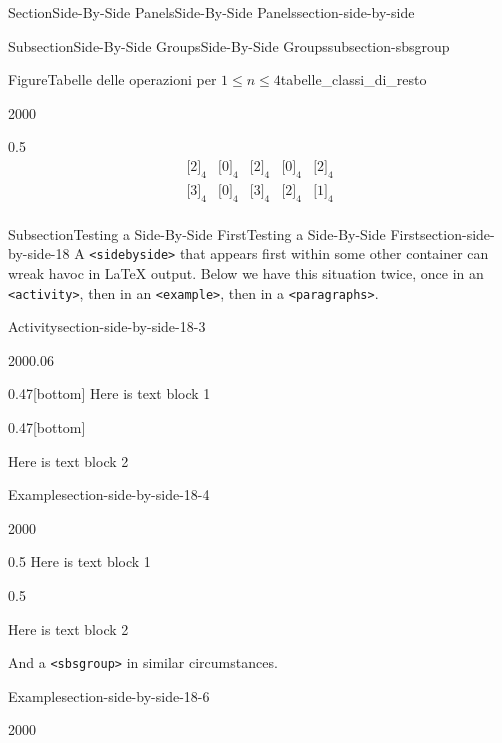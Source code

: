 \documentclass[twoside,10pt,]{article}
\newcommand{\mono}[1]{\texttt{#1}}
\numberwithin{equation}{section}
\newcommand{\class}[2][\sim]{\lbrack #2\rbrack_{#1}}
\newcommand{\amp}{&}
\begin{document}
\begin{sectionptx}{Section}{Side-By-Side Panels}{}{Side-By-Side Panels}{}{}{section-side-by-side}
\begin{subsectionptx}{Subsection}{Side-By-Side Groups}{}{Side-By-Side Groups}{}{}{subsection-sbsgroup}
\begin{figureptx}{Figure}{Tabelle delle operazioni per \(1\le n\le 4\)}{tabelle_classi_di_resto}{}
\begin{sidebyside}{2}{0}{0}{0}
\begin{sbspanel}{0.5}
\begin{equation*}
\begin{array}{c|cccc}
\class[4]{2} \amp \class[4]{0} \amp \class[4]{2} \amp \class[4]{0} \amp \class[4]{2} \\
\class[4]{3} \amp \class[4]{0} \amp \class[4]{3} \amp \class[4]{2} \amp \class[4]{1} \\
\end{array}
\end{equation*}
%
\end{sbspanel}%
\end{sidebyside}%
\tcblower
\end{figureptx}%
\end{subsectionptx}
%
%
\typeout{************************************************}
\typeout{************************************************}
%
\begin{subsectionptx}{Subsection}{Testing a Side-By-Side First}{}{Testing a Side-By-Side First}{}{}{section-side-by-side-18}
A \mono{<sidebyside>} that appears first within some other container can wreak havoc in \LaTeX{} output.  Below we have this situation twice, once in an \mono{<activity>}, then in an \mono{<example>}, then in a \mono{<paragraphs>}.%
\begin{activity}{Activity}{}{section-side-by-side-18-3}%
\begin{sidebyside}{2}{0}{0}{0.06}%
\begin{sbspanel}{0.47}[bottom]%
Here is text block 1%
\end{sbspanel}%
\begin{sbspanel}{0.47}[bottom]%
\par
Here is text block 2%
\end{sbspanel}%
\end{sidebyside}%
\end{activity}%
\begin{example}{Example}{}{section-side-by-side-18-4}%
\begin{sidebyside}{2}{0}{0}{0}%
\begin{sbspanel}{0.5}%
Here is text block 1%
\end{sbspanel}%
\begin{sbspanel}{0.5}%
\par
Here is text block 2%
\end{sbspanel}%
\end{sidebyside}%
\end{example}
And a \mono{<sbsgroup>} in similar circumstances.%
\begin{example}{Example}{}{section-side-by-side-18-6}%
\begin{sidebyside}{2}{0}{0}{0}%

\end{sidebyside}
\end{example}
\end{subsectionptx}
\end{sectionptx}
\end{document}
